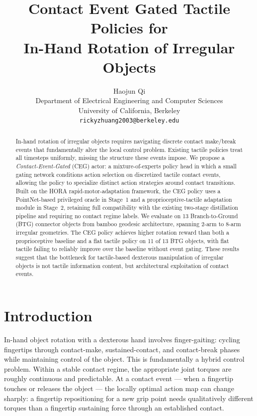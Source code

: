 \documentclass{article}
\title{Contact Event Gated Tactile Policies for\\In-Hand Rotation of Irregular Objects}
\author{
  Haojun Qi\\
  Department of Electrical Engineering and Computer Sciences\\
  University of California, Berkeley\\
  \texttt{rickyzhuang2003@berkeley.edu}
}
\begin{document}
\maketitle


\begin{abstract}
In-hand rotation of irregular objects requires navigating discrete contact make/break events
that fundamentally alter the local control problem. Existing tactile policies treat all
timesteps uniformly, missing the structure these events impose. We propose a
\emph{Contact-Event-Gated} (CEG) actor: a mixture-of-experts policy head in which a small
gating network conditions action selection on discretized tactile contact events, allowing the
policy to specialize distinct action strategies around contact transitions. Built on the HORA
rapid-motor-adaptation framework, the CEG policy uses a PointNet-based privileged oracle in
Stage~1 and a proprioceptive-tactile adaptation module in Stage~2, retaining full
compatibility with the existing two-stage distillation pipeline and requiring no contact regime
labels. We evaluate on 13 Branch-to-Ground (BTG) connector objects from bamboo geodesic
architecture, spanning 2-arm to 8-arm irregular geometries. The CEG policy achieves higher
rotation reward than both a proprioceptive baseline and a flat tactile policy on 11 of 13 BTG
objects, with flat tactile failing to reliably improve over the baseline without event gating.
These results suggest that the bottleneck for tactile-based dexterous manipulation of irregular
objects is not tactile information content, but architectural exploitation of contact events.
\end{abstract}



\section{Introduction}

In-hand object rotation with a dexterous hand involves finger-gaiting: cycling fingertips
through contact-make, sustained-contact, and contact-break phases while maintaining control of
the object. This is fundamentally a hybrid control problem. Within a stable contact regime, the
appropriate joint torques are roughly continuous and predictable. At a contact event — when a
fingertip touches or releases the object — the locally optimal action map can change sharply: a
fingertip repositioning for a new grip point needs qualitatively different torques than a
fingertip sustaining force through an established contact.
\end{document}
